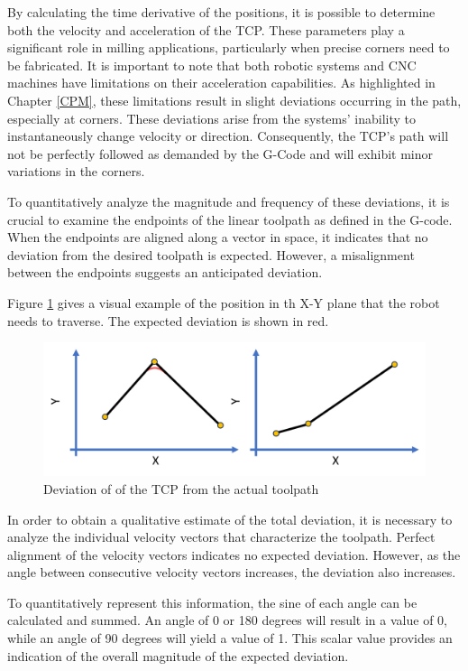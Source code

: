 By calculating the time derivative of the positions, it is possible to determine both the velocity and acceleration of the TCP. These parameters play a significant role in milling applications, particularly when precise corners need to be fabricated. It is important to note that both robotic systems and CNC machines have limitations on their acceleration capabilities. As highlighted in Chapter \ref{CPM}, these limitations result in slight deviations occurring in the path, especially at corners. These deviations arise from the systems' inability to instantaneously change velocity or direction. Consequently, the TCP's path will not be perfectly followed as demanded by the G-Code and will exhibit minor variations in the corners.

To quantitatively analyze the magnitude and frequency of these deviations, it is crucial to examine the endpoints of the linear toolpath as defined in the G-code. When the endpoints are aligned along a vector in space, it indicates that no deviation from the desired toolpath is expected. However, a misalignment between the endpoints suggests an anticipated deviation.

Figure \ref{devi} gives a visual example of the position in th X-Y plane that the robot needs to traverse. The expected deviation is shown in red.

\begin{figure}[H]
	\centerline{\includegraphics[width=.651\textwidth]{figures/uber.png}}
	\caption{Deviation of of the TCP from the actual toolpath}
	\label{devi}
\end{figure}

In order to obtain a qualitative estimate of the total deviation, it is necessary to analyze the individual velocity vectors that characterize the toolpath. Perfect alignment of the velocity vectors indicates no expected deviation. However, as the angle between consecutive velocity vectors increases, the deviation also increases.

To quantitatively represent this information, the sine of each angle can be calculated and summed. An angle of 0 or 180 degrees will result in a value of 0, while an angle of 90 degrees will yield a value of 1. This scalar value provides an indication of the overall magnitude of the expected deviation.

